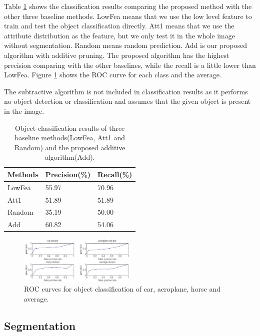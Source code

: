 \documentclass[10pt,twocolumn,letterpaper]{article}
\begin{document}
Table \ref{table:aresults} shows the classification results comparing the proposed method with 
the other three baseline methods. LowFea means that we use the low level feature to train and test 
the object classification directly. Att1 means that we use the attribute distribution as the feature,
but we only test it in the whole image without segmentation. Random means random prediction. Add is our
proposed algorithm with additive pruning. The proposed algorithm has the highest precision comparing 
with the other baselines, while the recall is a little lower than LowFea. Figure \ref{fig:roc_class} 
shows the ROC curve for each class and the average.

The subtractive algorithm is not included in classification results as it performs no
object detection or classification and assumes that the given object is present
in the image.


\begin{table}
\centering
\begin{tabular}{|l|l|l|}
\hline Methods & Precision(\%) & Recall(\%) \\
\hline LowFea  & 55.97 & 70.96 \\
\hline Att1    & 51.89 & 51.89 \\
\hline Random  & 35.19 & 50.00 \\
\hline Add     & 60.82 & 54.06 \\
\hline
\end{tabular}
\caption{Object classification results of three baseline methods(LowFea, Att1 and Random) and the proposed additive algorithm(Add).}
\label{table:aresults}
\end{table}


\begin{figure}
\centering
\includegraphics[width=0.5\textwidth]{figures/add_res/roc_class.png.eps}
\caption{ROC curves for object classification of car, aeroplane, horse and average.}
\label{fig:roc_class}
\end{figure}


\subsection{Segmentation}
\label{ssec:segmentation}
\end{document}
